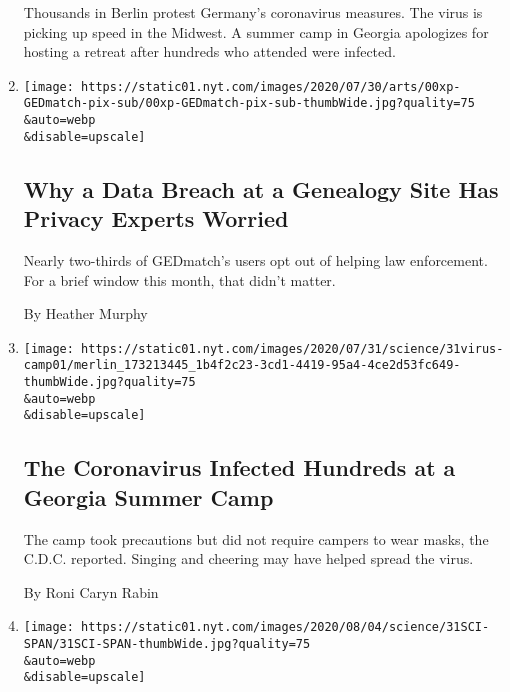 \begin{enumerate}
  Thousands in Berlin protest Germany's coronavirus measures. The virus
  is picking up speed in the Midwest. A summer camp in Georgia
  apologizes for hosting a retreat after hundreds who attended were
  infected.
\item
  \href{/2020/08/01/technology/gedmatch-breach-privacy.html}{}

  \texttt{[image: https://static01.nyt.com/images/2020/07/30/arts/00xp-GEDmatch-pix-sub/00xp-GEDmatch-pix-sub-thumbWide.jpg?quality=75\\\&auto=webp\\\&disable=upscale]}

  \hypertarget{why-a-data-breach-at-a-genealogy-site-has-privacy-experts-worried}{%
  \subsection{Why a Data Breach at a Genealogy Site Has Privacy Experts
  Worried}\label{why-a-data-breach-at-a-genealogy-site-has-privacy-experts-worried}}

  Nearly two-thirds of GEDmatch's users opt out of helping law
  enforcement. For a brief window this month, that didn't matter.

  By Heather Murphy
\item
  \href{/2020/07/31/health/coronavirus-children-camp.html}{}

  \texttt{[image: https://static01.nyt.com/images/2020/07/31/science/31virus-camp01/merlin\_173213445\_1b4f2c23-3cd1-4419-95a4-4ce2d53fc649-thumbWide.jpg?quality=75\\\&auto=webp\\\&disable=upscale]}

  \hypertarget{the-coronavirus-infected-hundreds-at-a-georgia-summer-camp}{%
  \subsection{The Coronavirus Infected Hundreds at a Georgia Summer
  Camp}\label{the-coronavirus-infected-hundreds-at-a-georgia-summer-camp}}

  The camp took precautions but did not require campers to wear masks,
  the C.D.C. reported. Singing and cheering may have helped spread the
  virus.

  By Roni Caryn Rabin
\item
  \href{/2020/07/31/health/coronavirus-ethics-rationing-elderly.html}{}

  \texttt{[image: https://static01.nyt.com/images/2020/08/04/science/31SCI-SPAN/31SCI-SPAN-thumbWide.jpg?quality=75\\\&auto=webp\\\&disable=upscale]}

  \hypertarget{the-new-old-age}{%
}
\end{enumerate}
